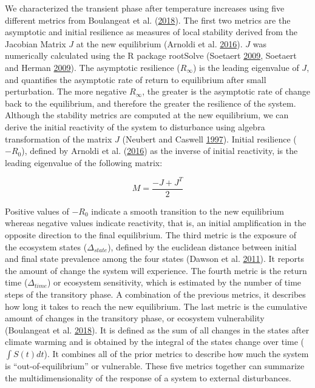 \documentclass[12pt]{article}
\begin{document}
We characterized the transient phase after temperature increases using
five different metrics from Boulangeat et al.
(\protect\hyperlink{ref-Boulangeat2018}{2018}). The first two metrics
are the asymptotic and initial resilience as measures of local stability
derived from the Jacobian Matrix \(J\) at the new equilibrium (Arnoldi
et al. \protect\hyperlink{ref-Arnoldi2016}{2016}). \(J\) was numerically
calculated using the R package rootSolve (Soetaert
\protect\hyperlink{ref-Soetaert2009a}{2009}, Soetaert and Herman
\protect\hyperlink{ref-Soetaert2009}{2009}). The asymptotic resilience
(\(R_{\infty}\)) is the leading eigenvalue of \(J\), and quantifies the
asymptotic rate of return to equilibrium after small perturbation. The
more negative \(R_{\infty}\), the greater is the asymptotic rate of
change back to the equilibrium, and therefore the greater the resilience
of the system. Although the stability metrics are computed at the new
equilibrium, we can derive the initial reactivity of the system to
disturbance using algebra transformation of the matrix \(J\) (Neubert
and Caswell \protect\hyperlink{ref-Neubert1997}{1997}). Initial
resilience (\(-R_0\)), defined by Arnoldi et al.
(\protect\hyperlink{ref-Arnoldi2016}{2016}) as the inverse of initial
reactivity, is the leading eigenvalue of the following matrix:

\[
M = \frac{-J + J^T}{2}
\]

Positive values of \(-R_0\) indicate a smooth transition to the new
equilibrium whereas negative values indicate reactivity, that is, an
initial amplification in the opposite direction to the final
equilibrium. The third metric is the exposure of the ecosystem states
(\(\Delta_{state}\)), defined by the euclidean distance between initial
and final state prevalence among the four states (Dawson et al.
\protect\hyperlink{ref-Dawson2011}{2011}). It reports the amount of
change the system will experience. The fourth metric is the return time
(\(\Delta_{time}\)) or ecosystem sensitivity, which is estimated by the
number of time steps of the transitory phase. A combination of the
previous metrics, it describes how long it takes to reach the new
equilibrium. The last metric is the cumulative amount of changes in the
transitory phase, or ecosystem vulnerability (Boulangeat et al.
\protect\hyperlink{ref-Boulangeat2018}{2018}). It is defined as the sum
of all changes in the states after climate warming and is obtained by
the integral of the states change over time (\(\int S(t)dt\)). It
combines all of the prior metrics to describe how much the system is
``out-of-equilibrium'' or vulnerable. These five metrics together can
summarize the multidimensionality of the response of a system to
external disturbances.
\end{document}
